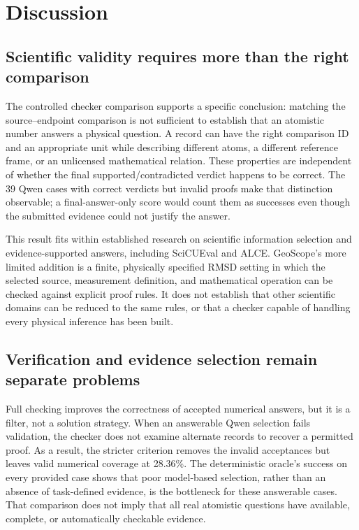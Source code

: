 \section{Discussion}
\label{sec:discussion}

\subsection{Scientific validity requires more than the right comparison}

The controlled checker comparison supports a specific conclusion: matching the source--endpoint comparison is not sufficient to establish that an atomistic number answers a physical question. A record can have the right comparison ID and an appropriate unit while describing different atoms, a different reference frame, or an unlicensed mathematical relation. These properties are independent of whether the final supported/contradicted verdict happens to be correct. The 39 Qwen cases with correct verdicts but invalid proofs make that distinction observable; a final-answer-only score would count them as successes even though the submitted evidence could not justify the answer.

This result fits within established research on scientific information selection and evidence-supported answers, including SciCUEval and ALCE.\cite{yu2026scicueval,gao2023enabling} GeoScope's more limited addition is a finite, physically specified RMSD setting in which the selected source, measurement definition, and mathematical operation can be checked against explicit proof rules. It does not establish that other scientific domains can be reduced to the same rules, or that a checker capable of handling every physical inference has been built.

\subsection{Verification and evidence selection remain separate problems}

Full checking improves the correctness of accepted numerical answers, but it is a filter, not a solution strategy. When an answerable Qwen selection fails validation, the checker does not examine alternate records to recover a permitted proof. As a result, the stricter criterion removes the invalid acceptances but leaves valid numerical coverage at 28.36\%. The deterministic oracle's success on every provided case shows that poor model-based selection, rather than an absence of task-defined evidence, is the bottleneck for these answerable cases. That comparison does not imply that all real atomistic questions have available, complete, or automatically checkable evidence.

